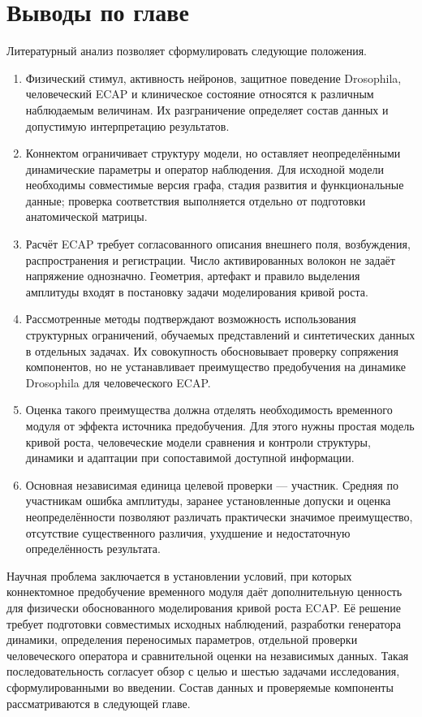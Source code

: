 \section*{Выводы по главе}
{}

Литературный анализ позволяет сформулировать следующие положения.
\begin{enumerate}
\item Физический стимул, активность нейронов, защитное поведение Drosophila, человеческий ECAP и клиническое состояние относятся к различным наблюдаемым величинам. Их разграничение определяет состав данных и допустимую интерпретацию результатов.
\item Коннектом ограничивает структуру модели, но оставляет неопределёнными динамические параметры и оператор наблюдения. Для исходной модели необходимы совместимые версия графа, стадия развития и функциональные данные; проверка соответствия выполняется отдельно от подготовки анатомической матрицы.
\item Расчёт ECAP требует согласованного описания внешнего поля, возбуждения, распространения и регистрации. Число активированных волокон не задаёт напряжение однозначно. Геометрия, артефакт и правило выделения амплитуды входят в постановку задачи моделирования кривой роста.
\item Рассмотренные методы подтверждают возможность использования структурных ограничений, обучаемых представлений и синтетических данных в отдельных задачах. Их совокупность обосновывает проверку сопряжения компонентов, но не устанавливает преимущество предобучения на динамике Drosophila для человеческого ECAP.
\item Оценка такого преимущества должна отделять необходимость временного модуля от эффекта источника предобучения. Для этого нужны простая модель кривой роста, человеческие модели сравнения и контроли структуры, динамики и адаптации при сопоставимой доступной информации.
\item Основная независимая единица целевой проверки --- участник. Средняя по участникам ошибка амплитуды, заранее установленные допуски и оценка неопределённости позволяют различать практически значимое преимущество, отсутствие существенного различия, ухудшение и недостаточную определённость результата.
\end{enumerate}

Научная проблема заключается в установлении условий, при которых коннектомное предобучение временного модуля даёт дополнительную ценность для физически обоснованного моделирования кривой роста ECAP. Её решение требует подготовки совместимых исходных наблюдений, разработки генератора динамики, определения переносимых параметров, отдельной проверки человеческого оператора и сравнительной оценки на независимых данных. Такая последовательность согласует обзор с целью и шестью задачами исследования, сформулированными во введении. Состав данных и проверяемые компоненты рассматриваются в следующей главе.
